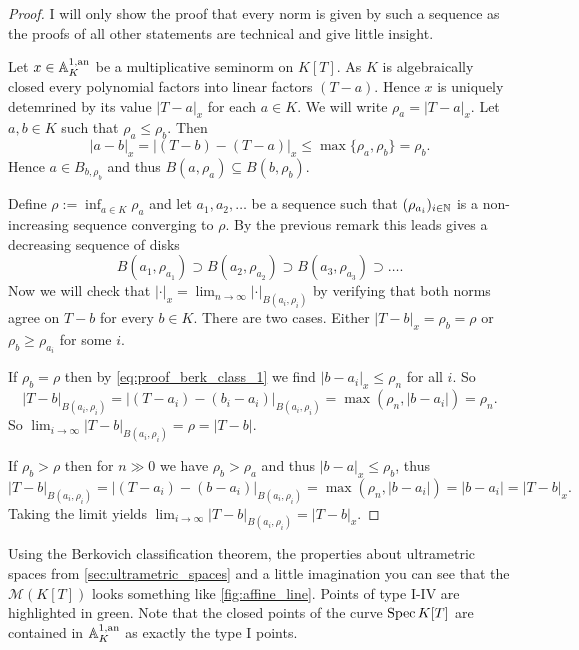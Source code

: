 \begin{proof}
	I will only show the proof that every norm is given by such a sequence as the proofs of all other statements are technical and give little insight. 

	Let $x \in \mathbb{A}_K^{1, \text{an}}$ be a multiplicative seminorm on $K[T]$. 
	As  $K$ is algebraically closed every polynomial factors into linear factors $(T-a)$. 
	Hence $x$ is uniquely detemrined by its value $|T-a|_x$ for each $a \in K$. 
	We will write $\rho_a = |T-a|_x$.
	Let  $a, b \in K$ such that $\rho_a \le \rho_b$. 
	Then  \begin{equation}\label{eq:proof_berk_class_1}
		|a - b|_x = |(T-b) - (T - a)|_x \le \max \{\rho_a, \rho_b\} = \rho_b 
	.\end{equation} 
	Hence $a \in B_{b, \rho_b}$ and thus  $B(a, \rho_a) \subseteq B(b, \rho_b)$. 

	Define $\rho := \inf_{a \in K} \rho_a$ and let $a_1, a_2, \ldots$ be a sequence such that $(\rho_{a_i})_{i \in \mathbb{N}}  $ is a non-increasing sequence converging to $\rho$. 
	By the previous remark this leads gives a decreasing sequence of disks \[
		B(a_1, \rho_{a_1}) \supset B(a_2, \rho_{a_2}) \supset B(a_3, \rho_{a_3}) \supset\ldots
	.\] 
	Now we will check that $|\cdot |_x = \lim_{n \to \infty} |\cdot |_{B(a_i, \rho_i)}$ by verifying that both norms agree on $T- b$ for every $b \in K$. 
	 There are two cases. Either $|T - b|_x = \rho_b = \rho$ or $\rho_b \ge \rho_{a_i}$ for some $i$. 

	 If $ \rho_b = \rho$ then by \eqref{eq:proof_berk_class_1} we find $|b - a_i|_x \le \rho_n$ for all $i$.
	 So \[
		 |T - b|_{B(a_i, \rho_i)} = |(T - a_i) - (b_i - a_i)|_{B(a_i, \rho_i)} = \max(\rho_n, |b - a_i|) = \rho_n
	 .\]
	 So $\lim_{i \to \infty} |T- b|_{B(a_i, \rho_i)} = \rho = |T - b|$. 

	 If $\rho_b > \rho$ then for $n \gg 0$ we have $\rho_b > \rho_a$ and thus $|b - a|_x \le \rho_b$, thus \[
		 |T - b|_{B(a_i, \rho_i)} = |(T - a_i) - (b -a_i)|_{B(a_i, \rho_i)} = \max (\rho_n, |b - a_i|) = |b - a_i| = |T - b|_x
	 .\]   
	 Taking the limit yields $\lim_{i \to \infty} |T- b| _{B(a_i, \rho_{i})} = |T - b|_x$.
\end{proof}

Using the Berkovich classification theorem, the properties about ultrametric spaces from \cref{sec:ultrametric_spaces} and a little imagination you can see that the $\mathcal{M} (K[T])$ looks something like \cref{fig:affine_line}. 
Points of type I-IV are highlighted in green. Note that the closed points of the curve $\operatorname{Spec} K[T]$ are contained in  $\mathbb{A}_K^{1,\text{an}}$ as exactly the type I points. 

